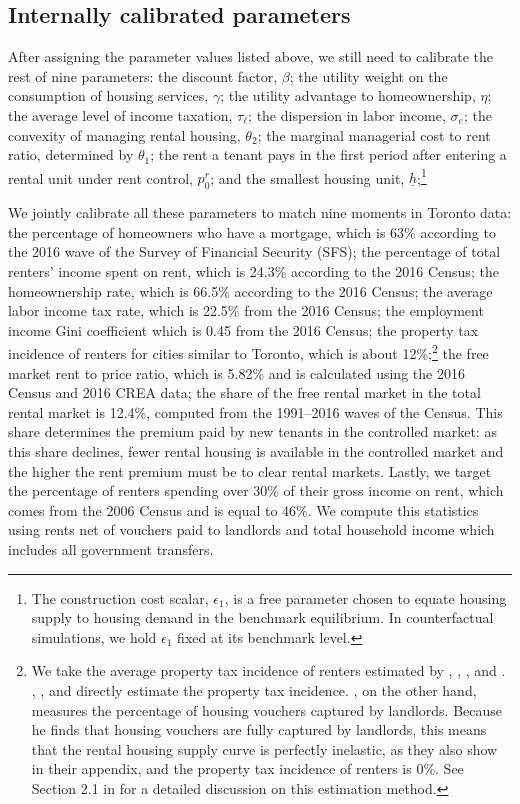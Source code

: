 \documentclass[parskip=full]{article}
\begin{document}
\subsection{Internally calibrated parameters}

After assigning the parameter values listed above, we still need to calibrate the rest of nine parameters: the discount factor, $\beta$; the utility weight on the consumption of housing services, $\gamma$; the utility advantage to homeownership, $\eta$; the average level of income taxation, $\tau_{\ell}$; the dispersion in labor income, $\sigma_{e}$; the convexity of managing rental housing, $\theta_{2}$; the marginal managerial cost to rent ratio, determined by $\theta_{1}$; the rent a tenant pays in the first period after entering a rental unit under rent control, $p^{r}_{0}$; and the smallest housing unit, $\underline{h}$;\footnote{The construction cost scalar, $\epsilon_{1}$, is a free parameter chosen to equate housing supply to housing demand in the benchmark equilibrium. In counterfactual simulations, we hold $\epsilon_{1}$ fixed at its benchmark level.}

We jointly calibrate all these parameters to match nine moments in Toronto data: the percentage of homeowners who have a mortgage, which is 63\% according to the 2016 wave of the Survey of Financial Security (SFS); the percentage of total renters' income spent on rent, which is 24.3\% according to the 2016 Census; the homeownership rate, which is 66.5\% according to the 2016 Census; the average labor income tax rate, which is 22.5\% from the 2016 Census; the employment income Gini coefficient which is 0.45 from the 2016 Census; the property tax incidence of renters for cities similar to Toronto, which is about 12\%;\footnote{We take the average property tax incidence of renters estimated by \citet{cy-1994}, \citet{susin-2002}, \citet{fack-2006}, and \citet{sy-2020}. \citet{cy-1994}, \citet{fack-2006}, and \citet{sy-2020} directly estimate the property tax incidence. \citet{susin-2002}, on the other hand, measures the percentage of housing vouchers captured by landlords. Because he finds that housing vouchers are fully captured by landlords, this means that the rental housing supply curve is perfectly inelastic, as they also show in their appendix, and the property tax incidence of renters is 0\%. See Section 2.1 in \citet{rs-2023} for a detailed discussion on this estimation method.} the free market rent to price ratio, which is 5.82\% and is calculated using the 2016 Census and 2016 CREA data; the share of the free rental market in the total rental market is 12.4\%, computed from the 1991--2016 waves of the Census. This share determines the premium paid by new tenants in the controlled market: as this share declines, fewer rental housing is available in the controlled market and the higher the rent premium must be to clear rental markets. Lastly, we target the percentage of renters spending over 30\% of their gross income on rent, which comes from the 2006 Census and is equal to 46\%. We compute this statistics using rents net of vouchers paid to landlords and total household income which includes all government transfers. 
\end{document}
